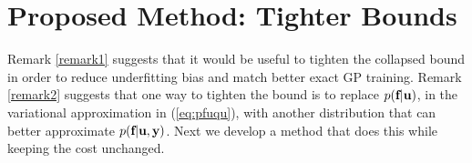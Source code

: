

\section{Proposed Method: Tighter Bounds
\label{sec:proposedmethod}
}

Remark \ref{remark1} suggests that 
it would be useful to tighten the collapsed bound 
in order to reduce underfitting bias 
and match better exact GP training. 
Remark \ref{remark2} suggests that one way to tighten the bound is to replace %
$p(\textbf{f} | \textbf{u})$, in the variational approximation in (\ref{eq:pfuqu}), with another distribution 
that can better approximate 
$p(\textbf{f} | \textbf{u}, \textbf{y})$. Next we develop a method that does this while keeping the cost unchanged. 

